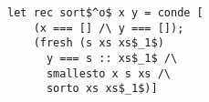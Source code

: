 \begin{figure}[h]
  \centering
  \begin{minipage}{0.87\columnwidth}
    \begin{lstlisting}[frame=tb]
 let rec sort$^o$ x y = conde [
    (x === [] /\ y === []);
    (fresh (s xs xs$_1$)
      y === s :: xs$_1$ /\
      smallesto x s xs /\
      sorto xs xs$_1$)]
    \end{lstlisting}
  \end{minipage}
\end{figure}
